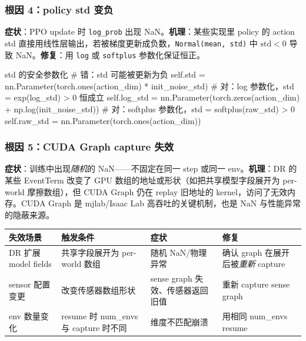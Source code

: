 \subsubsection{根因 4：policy std 变负}

\textbf{症状}：PPO update 时 \verb|log_prob| 出现 NaN。\textbf{机理}：某些实现里 policy 的 action std 直接用线性层输出，若被梯度更新成负数，\verb|Normal(mean, std)| 中 $\text{std}<0$ 导致 NaN。\textbf{修复}：用 \verb|log| 或 \verb|softplus| 参数化保证恒正。

\begin{codebox}[Python]{std 的安全参数化}
# 错：std 可能被更新为负
self.std = nn.Parameter(torch.ones(action_dim) * init_noise_std)
# 对：log 参数化，std = exp(log_std) > 0 恒成立
self.log_std = nn.Parameter(torch.zeros(action_dim) + np.log(init_noise_std))
# 对：softplus 参数化，std = softplus(raw_std) > 0
self.raw_std = nn.Parameter(torch.ones(action_dim))
\end{codebox}

\subsubsection{根因 5：CUDA Graph capture 失效}

\textbf{症状}：训练中出现\emph{随机}的 NaN——不固定在同一 step 或同一 env。\textbf{机理}：DR 的某些 EventTerm 改变了 GPU 数组的地址或形状（如把共享模型字段展开为 per-world 摩擦数组），但 CUDA Graph 仍在 replay 旧地址的 kernel，访问了无效内存。CUDA Graph 是 mjlab/Isaac Lab 高吞吐的关键机制，也是 NaN 与性能异常的隐蔽来源。

\begin{center}
\small
\begin{tabular}{@{}p{3.0cm}p{3.6cm}p{3.0cm}p{3.0cm}@{}}
\toprule
失效场景 & 触发条件 & 症状 & 修复 \\
\midrule
DR 扩展 model fields & 共享字段展开为 per-world 数组 & 随机 NaN/物理异常 & 确认 graph 在展开后被\emph{重新} capture \\
sensor 配置变更 & 改变传感器数组形状 & sense graph 失效、传感器返回旧值 & 重新 capture sense graph \\
env 数量变化 & resume 时 num\_envs 与 capture 时不同 & 维度不匹配崩溃 & 用相同 num\_envs resume \\
\bottomrule
\end{tabular}
\end{center}

